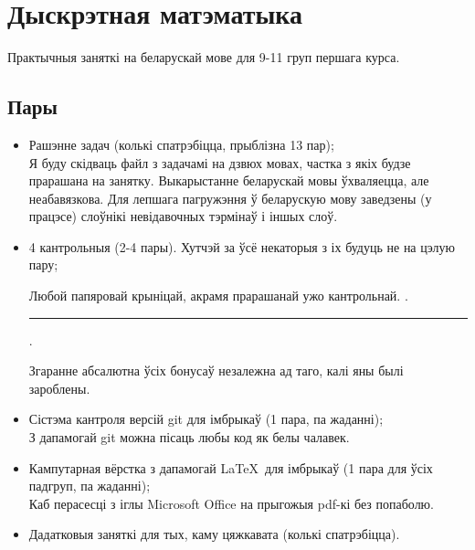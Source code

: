 \documentclass[12pt, a4paper]{extarticle}
\begin{document}
    \section{Дыскрэтная матэматыка}
    Практычныя заняткі на беларускай мове для 9-11 груп першага курса.

    \subsection{Пары}
    \begin{itemize}
        \item Рашэнне задач (колькі спатрэбіцца, прыблізна 13 пар); \\[6pt]
        {Я буду скідваць файл з задачамі на дзвюх мовах, частка з якіх будзе прарашана на занятку. Выкарыстанне беларускай мовы ўхваляецца, але неабавязкова. Для лепшага пагружэння ў беларускую мову заведзены (у працэсе) слоўнікі невідавочных тэрмінаў і іншых слоў.}
        \item 4 кантрольныя (2-4 пары). Хутчэй за ўсё некаторыя з іх будуць не на цэлую пару; \\[6pt]
        {Любой папяровай крыніцай, акрамя прарашанай ужо кантрольнай. .\noindent\rule{0.5cm}{0.4pt}. \\[6pt]}
        {Згаранне абсалютна ўсіх бонусаў незалежна ад таго, калі яны былі зароблены.}
        \item Сістэма кантроля версій git для імбрыкаў (1 пара, па жаданні); \\[6pt]
        {З дапамогай git можна пісаць любы код як белы чалавек.}
        \item Кампутарная вёрстка з дапамогай \LaTeX~для імбрыкаў (1 пара для ўсіх падгруп, па жаданні); \\[6pt]
        {Каб перасесці з іглы Microsoft Office на прыгожыя pdf-кі без попаболю.}
        \item Дадатковыя заняткі для тых, каму цяжкавата (колькі спатрэбіцца).
    \end{itemize}
\end{document}
